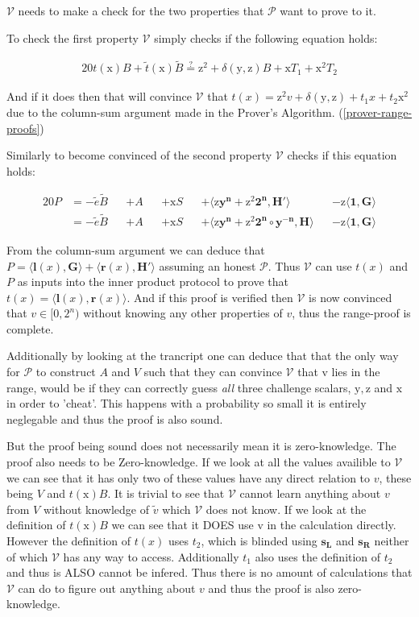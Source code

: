 \documentclass{article}
\newcommand{\eq}[1]{\begin{alignat*}{20}#1\end{alignat*}}
\renewcommand{\vec}[1]{\boldsymbol{#1}}
\newcommand{\ran}[1]{\mathrm{#1}}
\newcommand{\vecran}[1]{\mathbf{#1}}
\newcommand{\V}{\mathcal{V}}
\renewcommand{\P}{\mathcal{P}}
\newcommand{\tB}{\widetilde{B}}
\renewcommand{\tt}{\widetilde{t}}
\newcommand{\tv}{\widetilde{v}}
\newcommand{\dotp}[2]{\langle #1, #2 \rangle}
\begin{document}
$\V$ needs to make a check for the two properties that $\P$ want to prove to it.

To check the first property $\V$ simply checks if the following equation holds:

\eq{
	t(\ran{x})B + \tt(\ran{x})\tB \stackrel{?}{=} \ran{z^2} + \delta(\ran{y},\ran{z})B + \ran{x}T_1 + \ran{x^2}T_2
}

And if it does then that will convince $\V$ that $t(x) = \ran{z^2}v + \delta(\ran{y},\ran{z}) + t_1x + t_2\ran{x^2}$ due to the column-sum argument made in the Prover's Algorithm. (\ref{prover-range-proofs})

Similarly to become convinced of the second property $\V$ checks if this equation holds:

\eq{
	P &= -\widetilde{e}\tB &&+ A &&+ \ran{x}S &&+ \dotp{\ran{z}\vecran{y^n} + \ran{z^2}\vec{2^n}}{\vec{H'}} &&- \ran{z}\dotp{\vec{1}}{\vec{\vec{G}}} \\
	&= -\widetilde{e}\tB &&+ A &&+ \ran{x}S &&+ \dotp{\ran{z}\vecran{y^n} + \ran{z^2}\vec{2^n}\circ\vecran{y^{-n}}}{\vec{H}} &&- \ran{z}\dotp{\vec{1}}{\vec{G}}
}

From the column-sum argument we can deduce that $P = \dotp{\vec{l}(x)}{\vec{G}} + \dotp{\vec{r}(x)}{\vec{H'}}$ assuming an honest $\P$. Thus $\V$ can use $t(x)$ and $P$ as inputs into the inner product protocol to prove that $ t(x) = \dotp{\vec{l}(x)}{\vec{r}(x)}$. And if this proof is verified then $\V$ is now convinced that $v\in [0,2^n)$ without knowing any other properties of $v$, thus the range-proof is complete.

Additionally by looking at the trancript one can deduce that that the only way for $\P$ to construct $A$ and $V$ such that they can convince $\V$ that v lies in the range, would be if they can correctly guess \textit{all} three challenge scalars, $\ran{y}, \ran{z}$ and $\ran{x}$ in order to 'cheat'. This happens with a probability so small it is entirely neglegable and thus the proof is also sound.

But the proof being sound does not necessarily mean it is zero-knowledge. The proof also needs to be Zero-knowledge. If we look at all the values availible to $\V$ we can see that it has only two of these values have any direct relation to $v$, these being $V$ and $t(\ran{x})B$. It is trivial to see that $\V$ cannot learn anything about $v$ from $V$ without knowledge of $\tv$ which $\V$ does not know. If we look at the definition of $t(\ran{x})B$ we can see that it DOES use v in the calculation directly. However the definition of $t(x)$ uses $t_2$, which is blinded using $\vecran{s_L}$ and $\vecran{s_R}$ neither of which $\V$ has any way to access. Additionally $t_1$ also uses the definition of $t_2$ and thus is ALSO cannot be infered. Thus there is no amount of calculations that $\V$ can do to figure out anything about $v$ and thus the proof is also zero-knowledge.
\end{document}
